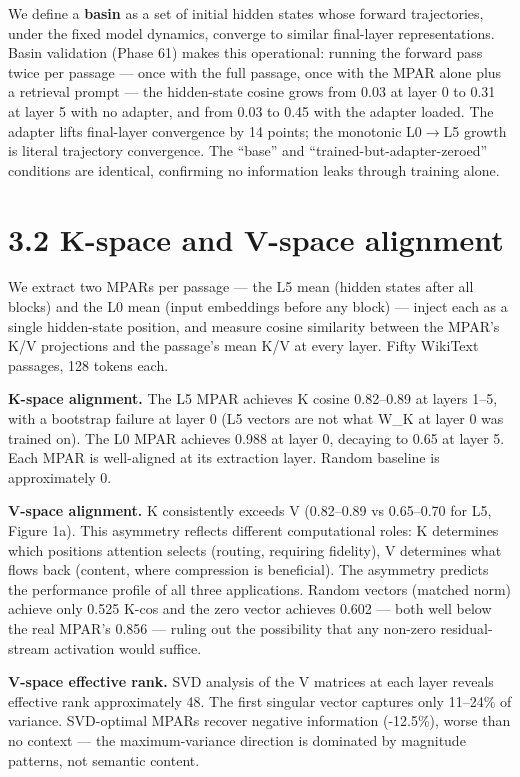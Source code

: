 We define a \textbf{basin} as a set of initial hidden states whose forward trajectories, under the fixed model dynamics, converge to similar final-layer representations. Basin validation (Phase 61) makes this operational: running the forward pass twice per passage --- once with the full passage, once with the MPAR alone plus a retrieval prompt --- the hidden-state cosine grows from 0.03 at layer 0 to 0.31 at layer 5 with no adapter, and from 0.03 to 0.45 with the adapter loaded. The adapter lifts final-layer convergence by 14 points; the monotonic L0$\rightarrow$L5 growth is literal trajectory convergence. The ``base'' and ``trained-but-adapter-zeroed'' conditions are identical, confirming no information leaks through training alone.

\section{3.2 K-space and V-space alignment}\label{k-space-and-v-space-alignment}

We extract two MPARs per passage --- the L5 mean (hidden states after all blocks) and the L0 mean (input embeddings before any block) --- inject each as a single hidden-state position, and measure cosine similarity between the MPAR's K/V projections and the passage's mean K/V at every layer. Fifty WikiText passages, 128 tokens each.

\textbf{K-space alignment.} The L5 MPAR achieves K cosine 0.82--0.89 at layers 1--5, with a bootstrap failure at layer 0 (L5 vectors are not what W\_K at layer 0 was trained on). The L0 MPAR achieves 0.988 at layer 0, decaying to 0.65 at layer 5. Each MPAR is well-aligned at its extraction layer. Random baseline is approximately 0.

\textbf{V-space alignment.} K consistently exceeds V (0.82--0.89 vs 0.65--0.70 for L5, Figure 1a). This asymmetry reflects different computational roles: K determines which positions attention selects (routing, requiring fidelity), V determines what flows back (content, where compression is beneficial). The asymmetry predicts the performance profile of all three applications. Random vectors (matched norm) achieve only 0.525 K-cos and the zero vector achieves 0.602 --- both well below the real MPAR's 0.856 --- ruling out the possibility that any non-zero residual-stream activation would suffice.

\textbf{V-space effective rank.} SVD analysis of the V matrices at each layer reveals effective rank approximately 48. The first singular vector captures only 11--24\% of variance. SVD-optimal MPARs recover negative information (-12.5\%), worse than no context --- the maximum-variance direction is dominated by magnitude patterns, not semantic content.

